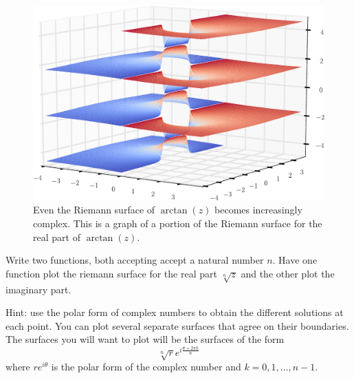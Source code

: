 \begin{figure}
\includegraphics[width=\textwidth]{arctan_riemann_surface}
\caption{Even the Riemann surface of $\arctan(z)$ becomes increasingly complex.
This is a graph of a portion of the Riemann surface for the real part of $\arctan(z)$.}
\label{fig:arctan_riemann_surface}
\end{figure}

\begin{problem}
Write two functions, both accepting accept a natural number $n$.
Have one function plot the riemann surface for the real part $\sqrt[n]{z}$ and the other plot the imaginary part.

Hint: use the polar form of complex numbers to obtain the different solutions at each point.
You can plot several separate surfaces that agree on their boundaries.
The surfaces you will want to plot will be the surfaces of the form
\[\sqrt[n]{r} e^{i \frac{\theta + 2 \pi k}{n}}\]
where $r e^{i \theta}$ is the polar form of the complex number and $k = 0, 1, \dots, n-1$.
\end{problem}